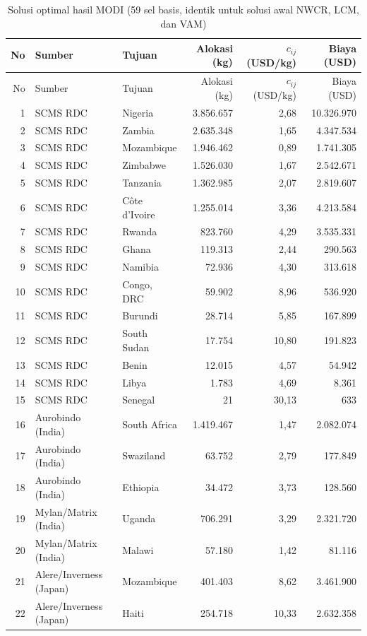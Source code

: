 \begin{longtable}{rllrrr}\caption{Solusi optimal hasil MODI (59 sel basis, identik untuk solusi awal NWCR, LCM, dan VAM)}\label{tab:final}\\\toprule No & Sumber & Tujuan & Alokasi (kg) & $c_{ij}$ (USD/kg) & Biaya (USD) \\ \midrule\endfirsthead
\toprule No & Sumber & Tujuan & Alokasi (kg) & $c_{ij}$ (USD/kg) & Biaya (USD) \\ \midrule\endhead
1 & SCMS RDC & Nigeria & 3.856.657 & 2,68 & 10.326.970 \\
2 & SCMS RDC & Zambia & 2.635.348 & 1,65 & 4.347.534 \\
3 & SCMS RDC & Mozambique & 1.946.462 & 0,89 & 1.741.305 \\
4 & SCMS RDC & Zimbabwe & 1.526.030 & 1,67 & 2.542.671 \\
5 & SCMS RDC & Tanzania & 1.362.985 & 2,07 & 2.819.607 \\
6 & SCMS RDC & Côte d'Ivoire & 1.255.014 & 3,36 & 4.213.584 \\
7 & SCMS RDC & Rwanda & 823.760 & 4,29 & 3.535.331 \\
8 & SCMS RDC & Ghana & 119.313 & 2,44 & 290.563 \\
9 & SCMS RDC & Namibia & 72.936 & 4,30 & 313.618 \\
10 & SCMS RDC & Congo, DRC & 59.902 & 8,96 & 536.920 \\
11 & SCMS RDC & Burundi & 28.714 & 5,85 & 167.899 \\
12 & SCMS RDC & South Sudan & 17.754 & 10,80 & 191.823 \\
13 & SCMS RDC & Benin & 12.015 & 4,57 & 54.942 \\
14 & SCMS RDC & Libya & 1.783 & 4,69 & 8.361 \\
15 & SCMS RDC & Senegal & 21 & 30,13 & 633 \\
16 & Aurobindo (India) & South Africa & 1.419.467 & 1,47 & 2.082.074 \\
17 & Aurobindo (India) & Swaziland & 63.752 & 2,79 & 177.849 \\
18 & Aurobindo (India) & Ethiopia & 34.472 & 3,73 & 128.560 \\
19 & Mylan/Matrix (India) & Uganda & 706.291 & 3,29 & 2.321.720 \\
20 & Mylan/Matrix (India) & Malawi & 57.180 & 1,42 & 81.116 \\
21 & Alere/Inverness (Japan) & Mozambique & 401.403 & 8,62 & 3.461.900 \\
22 & Alere/Inverness (Japan) & Haiti & 254.718 & 10,33 & 2.632.358 \\

\end{longtable}
